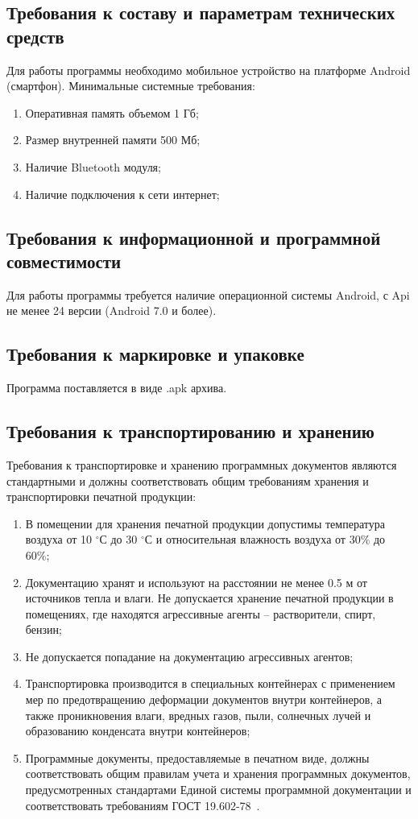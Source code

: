 \documentclass[techtask]{espd}
\begin{document}
\subsection{Требования к составу и параметрам технических средств}\label{subsection:requirements}
Для работы программы необходимо мобильное устройство на платформе Android (смартфон). Минимальные системные требования:

\begin{enumerate}
\item Оперативная память объемом 1 Гб;
\item Размер внутренней памяти 500 Мб;
\item Наличие Bluetooth модуля;
\item Наличие подключения к сети интернет;
\end{enumerate}

\subsection{Требования к информационной и программной совместимости}
Для работы программы требуется наличие операционной системы Android, с Api не менее 24 версии (Android 7.0 и более).

\subsection{Требования к маркировке и упаковке}
Программа поставляется в виде .apk архива.

\subsection{Требования к транспортированию и хранению}
Требования к транспортировке и хранению программных документов являются стандартными и должны соответствовать общим требованиям хранения и транспортировки печатной продукции:

\begin{enumerate}
\item В помещении для хранения печатной продукции допустимы температура воздуха от 10 $^\circ$С до 30 $^\circ$С и относительная влажность воздуха от 30\% до 60\%;
\item Документацию хранят и используют на расстоянии не менее 0.5 м от источников тепла и влаги. Не допускается хранение печатной продукции в помещениях, где находятся агрессивные агенты – растворители, спирт, бензин;
\item Не допускается попадание на документацию агрессивных агентов;
\item Транспортировка производится в специальных контейнерах с применением мер по предотвращению деформации документов внутри контейнеров, а также проникновения влаги, вредных газов, пыли, солнечных лучей и образованию конденсата внутри контейнеров;
\item Программные документы, предоставляемые в печатном виде, должны соответствовать общим правилам учета и хранения программных документов, предусмотренных стандартами Единой системы программной документации и соответствовать требованиям ГОСТ 19.602-78~\cite{espd602}.
\end{enumerate}
\end{document}

